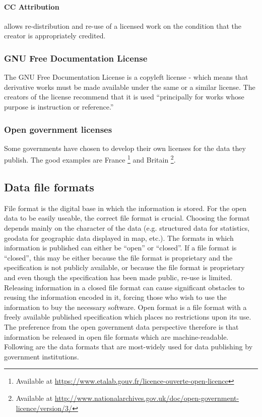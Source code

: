 \documentclass[thesis=B,english]{FITthesis}[2012/06/26]
\begin{document}
	\paragraph{CC Attribution}
	allows re-distribution and re-use of a licensed work on the condition that the creator is appropriately credited.
	\subsubsection{GNU Free Documentation License}
	The GNU Free Documentation License is a copyleft license - which means that derivative works must be made available under the same or a similar license. The creators of the license recommend that it is used “principally for works whose purpose is instruction or reference.”
	\subsubsection{Open government licenses}
	\label{opengovernmentlicense}
	Some governments have chosen to develop their own licenses for the data they publish. The good examples are France \footnote{Available at \url{https://www.etalab.gouv.fr/licence-ouverte-open-licence}} and Britain \footnote{Available at \url{http://www.nationalarchives.gov.uk/doc/open-government-licence/version/3/}}.
	\subsection{Data file formats}
	\label{fileformats}
	 File format is the digital base in which the information is stored. For the open data to be easily useable, the correct file format is crucial. Choosing the format depends mainly on the character of the data (e.g. structured data for statistics, geodata for geographic data displayed in map, etc.). The formats in which information is published can either be “open” or “closed”. If a file format is “closed”, this may be either because the file format is proprietary and the specification is not publicly available, or because the file format is proprietary and even though the specification has been made public, re-use is limited. Releasing information in a closed file format can cause significant obstacles to reusing the information encoded in it, forcing those who wish to use the information to buy the necessary software. Open format is a file format with a freely available published specification which places no restrictions upon its use. The preference from the open government data perspective therefore is that information be released in open file formats which are machine-readable. Following are the data formats that are most-widely used for data publishing by government institutions.\cite{opendatahandbookfileformats}
	 
\end{document}
